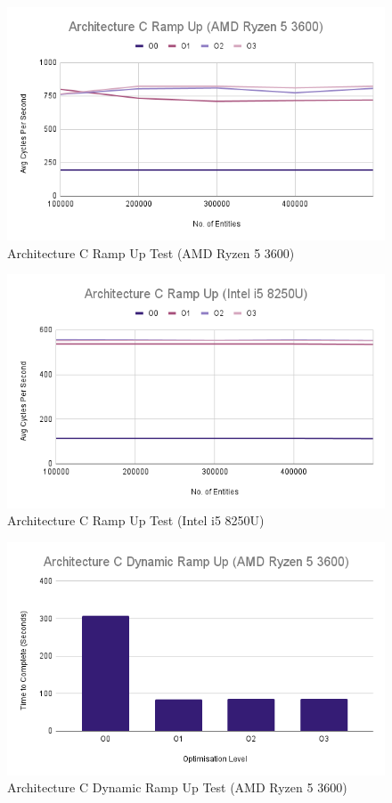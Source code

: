 \documentclass{article}
\begin{document}
\begin{figure}[!h]
\centering
\includegraphics[scale=0.5]{Architecture C Ramp Up (AMD Ryzen 5 3600).png}
\caption{Architecture C Ramp Up Test (AMD Ryzen 5 3600)}
\label{arch_c_ramp_up_pc}
\end{figure}

\begin{figure}[!h]
\centering
\includegraphics[scale=0.5]{Architecture C Ramp Up (Intel i5 8250U).png}
\caption{Architecture C Ramp Up Test (Intel i5 8250U)}
\label{arch_c_ramp_up_laptop}
\end{figure}

\begin{figure}[!h]
\centering
\includegraphics[scale=0.5]{Architecture C Dynamic Ramp Up (AMD Ryzen 5 3600).png}
\caption{Architecture C Dynamic Ramp Up Test (AMD Ryzen 5 3600)}
\label{arch_c_dynamic_ramp_up_pc}
\end{figure}
\end{document}
